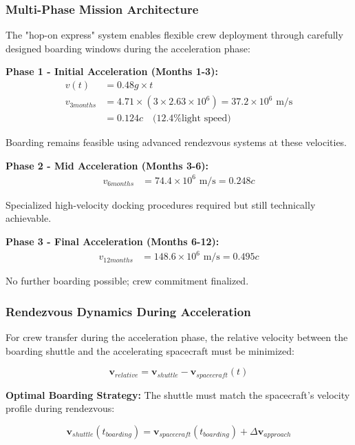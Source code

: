 \documentclass[11pt,a4paper]{article}
\theoremstyle{remark}
\begin{document}
\subsubsection{Multi-Phase Mission Architecture}

The "hop-on express" system enables flexible crew deployment through carefully designed boarding windows during the acceleration phase:

\textbf{Phase 1 - Initial Acceleration (Months 1-3):}
\begin{align}
v(t) &= 0.48g \times t \\
v_{3months} &= 4.71 \times (3 \times 2.63 \times 10^6) = 37.2 \times 10^6 \text{ m/s} \\
&= 0.124c \quad \text{(12.4\% light speed)}
\end{align}

Boarding remains feasible using advanced rendezvous systems at these velocities.

\textbf{Phase 2 - Mid Acceleration (Months 3-6):}
\begin{align}
v_{6months} &= 74.4 \times 10^6 \text{ m/s} = 0.248c
\end{align}

Specialized high-velocity docking procedures required but still technically achievable.

\textbf{Phase 3 - Final Acceleration (Months 6-12):}
\begin{align}
v_{12months} &= 148.6 \times 10^6 \text{ m/s} = 0.495c
\end{align}

No further boarding possible; crew commitment finalized.

\subsubsection{Rendezvous Dynamics During Acceleration}

For crew transfer during the acceleration phase, the relative velocity between the boarding shuttle and the accelerating spacecraft must be minimized:

\begin{equation}
\mathbf{v}_{relative} = \mathbf{v}_{shuttle} - \mathbf{v}_{spacecraft}(t)
\end{equation}

\textbf{Optimal Boarding Strategy:}
The shuttle must match the spacecraft's velocity profile during rendezvous:

\begin{equation}
\mathbf{v}_{shuttle}(t_{boarding}) = \mathbf{v}_{spacecraft}(t_{boarding}) + \Delta\mathbf{v}_{approach}
\end{equation}
\end{document}
